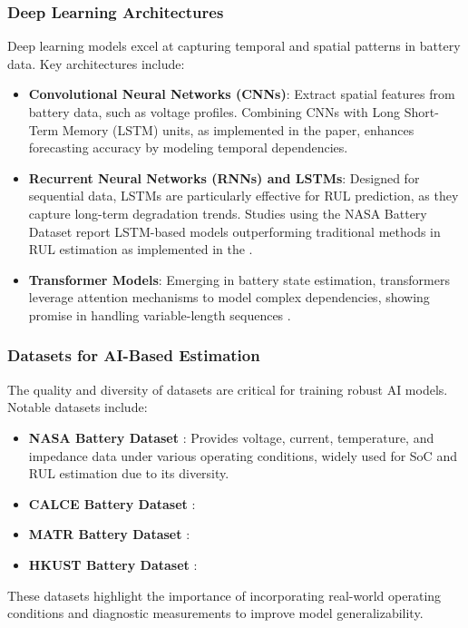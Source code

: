 \subsubsection{Deep Learning Architectures}
Deep learning models excel at capturing temporal and spatial patterns in battery data. Key architectures include:
\begin{itemize}
    \item \textbf{Convolutional Neural Networks (CNNs)}: Extract spatial features from battery data, such as voltage profiles. Combining CNNs with Long Short-Term Memory (LSTM) units, as implemented in the \cite{Fangfang_Yang} paper, enhances forecasting accuracy by modeling temporal dependencies.
    \item \textbf{Recurrent Neural Networks (RNNs) and LSTMs}: Designed for sequential data, LSTMs are particularly effective for RUL prediction, as they capture long-term degradation trends. Studies using the NASA Battery Dataset \cite{noauthor_nasa_nodate} report LSTM-based models outperforming traditional methods in RUL estimation as implemented in the \cite{hong_state--health_2023}.
    \item \textbf{Transformer Models}: Emerging in battery state estimation, transformers leverage attention mechanisms to model complex dependencies, showing promise in handling variable-length sequences \cite{yilmaz_transformer-based_2025}.
\end{itemize}

\subsubsection{Datasets for AI-Based Estimation}
The quality and diversity of datasets are critical for training robust AI models. Notable datasets include:
\begin{itemize}
    \item \textbf{NASA Battery Dataset} \cite{noauthor_nasa_nodate}: Provides voltage, current, temperature, and impedance data under various operating conditions, widely used for SoC and RUL estimation due to its diversity.
    \item \textbf{CALCE Battery Dataset} \cite{CALCE_battery_nodate}:
    \item \textbf{MATR Battery Dataset} \cite{MATR_dataset_nodate}: 
    \item \textbf{HKUST Battery Dataset} \cite{pepe_hkust_nodate}: 
\end{itemize}
These datasets highlight the importance of incorporating real-world operating conditions and diagnostic measurements to improve model generalizability.

